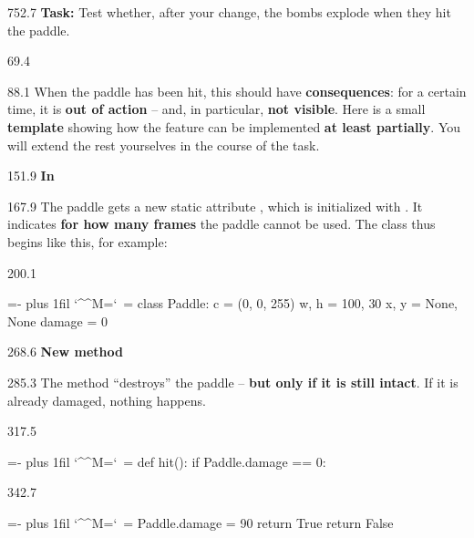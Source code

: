 \documentclass{aslab}
\makeatletter
\newcommand*\kw[1]{\textcolor{codeorange}{#1}}
\newcommand*\fn[1]{\textcolor{codecyan}{#1}}
\newcommand*\num[1]{\textcolor{codered}{#1}}
\newenvironment{pycode}{\par\ttfamily\hyphenchar\font=-1
  \lineskiplimit=-\maxdimen\lineskip=0pt\parindent=0pt
  \parfillskip=0pt plus 1fil\relax
  \catcode`\^^M=\active\catcode`\ =\active\py@setup\py@gobble}{}
\newcommand*\emo[1]{\makebox[18bp][l]{\emoji{#1}}}
\makeatother
\begin{document}
\begin{region}{752.7}
\textbf{Task:} Test whether, after your change, the bombs explode when they
hit the paddle.
\end{region}

\nextpage
\begin{region}{69.4}
\end{region}

\begin{region}[pitch=14.0]{88.1}
When the paddle has been hit, this should have \textbf{consequences}: for a
certain time, it is \textbf{out of action} -- and, in particular,
\textbf{not visible}. Here is a small \textbf{template} showing how the
feature can be implemented \textbf{at least partially}. You will extend the
rest yourselves in the course of the task.
\end{region}

\begin{region}{151.9}
\emo{1F9F1}\textbf{In} 
\end{region}

\begin{region}[pitch=14.2]{167.9}
The paddle gets a new static attribute , which is initialized
with . It indicates \textbf{for how many frames} the paddle cannot be
used. The class  thus begins like this, for example:
\end{region}

\begin{region}[]{200.1}
\begin{pycode}
\kw{class} \fn{Paddle}:
    c = (\num{0}, \num{0}, \num{255})
    w, h = \num{100}, \num{30}
    x, y = \fn{None}, \fn{None}
    damage = \num{0}
\end{pycode}
\end{region}

\begin{region}{268.6}
\emo{1F4A5}\textbf{New method} 
\end{region}

\begin{region}[pitch=13.3]{285.3}
The method  ``destroys'' the paddle -- \textbf{but only if it is
still intact}. If it is already damaged, nothing happens.
\end{region}

\begin{region}[pitch=13.2]{317.5}
\begin{pycode}
    \kw{def} \fn{hit}():
        \kw{if} Paddle.damage == \num{0}:
\end{pycode}
\end{region}
\begin{region}[]{342.7}
\begin{pycode}
            Paddle.damage = \num{90}
            \kw{return} \fn{True}
        \kw{return} \fn{False}
\end{pycode}
\end{region}
\end{document}
